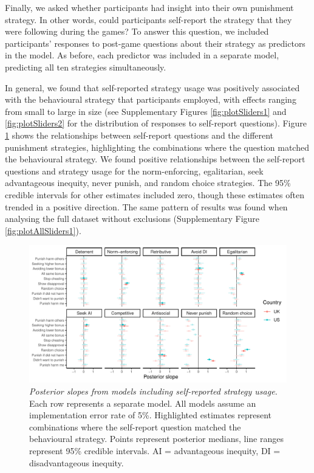 \documentclass[
  english,
  man, donotrepeattitle,floatsintext]{apa6}
\begin{document}
Finally, we asked whether participants had insight into their own punishment
strategy. In other words, could participants self-report the strategy that they
were following during the games? To answer this question, we included
participants' responses to post-game questions about their strategy as
predictors in the model. As before, each predictor was included in a separate
model, predicting all ten strategies simultaneously.

In general, we found that self-reported strategy usage was positively associated
with the behavioural strategy that participants employed, with effects ranging
from small to large in size (see Supplementary Figures \ref{fig:plotSliders1}
and \ref{fig:plotSliders2} for the distribution of responses to self-report
questions). Figure \ref{fig:plotAllSliders2} shows the relationships between
self-report questions and the different punishment strategies, highlighting the
combinations where the question matched the behavioural strategy. We found
positive relationships between the self-report questions and strategy usage for
the norm-enforcing, egalitarian, seek advantageous inequity, never punish, and
random choice strategies. The 95\% credible intervals for other estimates
included zero, though these estimates often trended in a positive direction. The
same pattern of results was found when analysing the full dataset without
exclusions (Supplementary Figure \ref{fig:plotAllSliders1}).








\begin{figure}
\centering
\includegraphics{manuscript_files/figure-latex/plotAllSliders2-1.pdf}
\caption{\label{fig:plotAllSliders2}\emph{Posterior slopes from models including
self-reported strategy usage.} Each row represents a separate model. All models
assume an implementation error rate of 5\%. Highlighted estimates represent
combinations where the self-report question matched the behavioural strategy.
Points represent posterior medians, line ranges represent 95\% credible
intervals. AI = advantageous inequity, DI = disadvantageous inequity.}
\end{figure}
\end{document}
